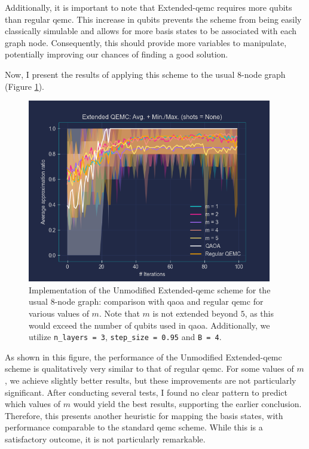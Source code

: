 Additionally, it is important to note that Extended-\acrshort{qemc} requires more qubits than regular \acrshort{qemc}. This increase in qubits prevents the scheme from being easily classically simulable and allows for more basis states to be associated with each graph node. Consequently, this should provide more variables to manipulate, potentially improving our chances of finding a good solution.

Now, I present the results of applying this scheme to the usual $8$-node graph (Figure \ref{fig:Vanilla_Extended-QEMC}).
\begin{figure}[h]
    \centering
    \includegraphics[width=0.95\textwidth]{Figures/Chapter_5/Extended-QEMC/8-node(n_layers=3, step_size=0.95, m=All).png}
    \caption{Implementation of the Unmodified Extended-\acrshort{qemc} scheme for the usual $8$-node graph: comparison with \acrshort{qaoa} and regular \acrshort{qemc} for various values of $m$. Note that $m$ is not extended beyond $5$, as this would exceed the number of qubits used in \acrshort{qaoa}. Additionally, we utilize \texttt{n\_layers = 3}, \texttt{step\_size = 0.95} and \texttt{B = 4}.}
    \label{fig:Vanilla_Extended-QEMC}
\end{figure}

\noindent As shown in this figure, the performance of the Unmodified Extended-\acrshort{qemc} scheme is qualitatively very similar to that of regular \acrshort{qemc}. For some values of $m$, we achieve slightly better results, but these improvements are not particularly significant. After conducting several tests, I found no clear pattern to predict which values of $m$ would yield the best results, supporting the earlier conclusion. Therefore, this presents another heuristic for mapping the basis states, with performance comparable to the standard \acrshort{qemc} scheme. While this is a satisfactory outcome, it is not particularly remarkable.


